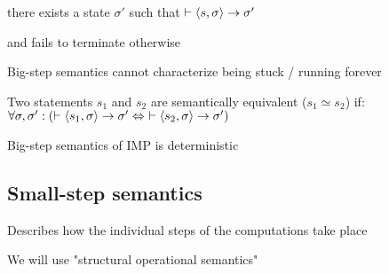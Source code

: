 	\enumstart
		\item there exists a state $\sigma'$ such that $\vdash \langle s, \sigma \rangle \rightarrow \sigma'$
		\item and fails to terminate otherwise
	\enumend
	\item Big-step semantics cannot characterize being stuck / running forever
	\item Two statements $s_1$ and $s_2$ are semantically equivalent ($s_1 \simeq s_2$) if: $\forall \sigma, \sigma': (\vdash \langle s_1, \sigma \rangle \rightarrow \sigma' \Leftrightarrow \ \vdash \langle s_2, \sigma \rangle \rightarrow \sigma')$
	\item Big-step semantics of IMP is deterministic
\enumend

\subsection{Small-step semantics}
\enumstart
	\item Describes how the individual steps of the computations take place
	\item We will use "structural operational semantics"
\enumend
